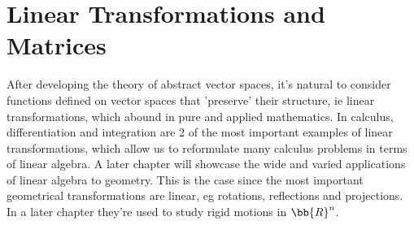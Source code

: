 \chapter{Linear Transformations and Matrices}
After developing the theory of abstract vector spaces, it's natural to consider functions defined on vector spaces that 'preserve' their structure, ie linear transformations, which abound in pure and applied mathematics.
In calculus, differentiation and integration are 2 of the most important examples of linear transformations, which allow us to reformulate many calculus problems in terms of linear algebra.
A later chapter will showcase the wide and varied applications of linear algebra to geometry. This is the case since the most important geometrical transformations are linear, eg rotations, reflections and projections. In a later chapter they're used to study rigid motions in $\bb{R}^n$.

